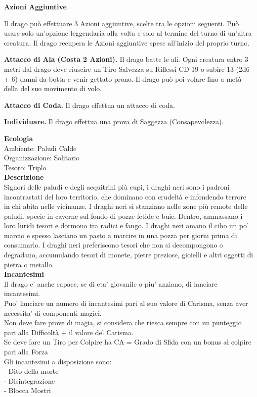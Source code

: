 \begin{multicols}{2}
\textbf{Azioni Aggiuntive}

Il drago può effettuare 3 Azioni aggiuntive, scelte tra le opzioni seguenti. Può usare solo un'opzione leggendaria alla volta e solo al termine del turno di un'altra creatura. Il drago recupera le Azioni aggiuntive spese all'inizio del proprio turno.

\textbf{Attacco di Ala (Costa 2 Azioni).} Il drago batte le ali. Ogni creatura entro 3 metri dal drago deve riuscire un Tiro Salvezza su Riflessi CD 19 o subire 13 (2d6 + 6) danni da botta e venir gettato prono. Il drago può poi volare fino a metà della del suo movimento di volo.

\textbf{Attacco di Coda.} Il drago effettua un attacco di coda.

\textbf{Individuare.} Il drago effettua una prova di Saggezza (Consapevolezza).

\textbf{Ecologia}\\
Ambiente: Paludi Calde\\
Organizzazione: Solitario\\
Tesoro: Triplo\\
\textbf{Descrizione}\\
Signori delle paludi e degli acquitrini più cupi, i draghi neri sono i padroni incontrastati del loro territorio, che dominano con crudeltà e infondendo terrore in chi abita nelle vicinanze. I draghi neri si stanziano nelle zone più remote delle paludi, specie in caverne sul fondo di pozze fetide e buie. Dentro, ammassano i loro luridi tesori e dormono tra radici e fango. I draghi neri amano il cibo un po' marcio e spesso lasciano un pasto a marcire in una pozza per giorni prima di consumarlo. I draghi neri preferiscono tesori che non si decompongono o degradano, accumulando tesori di monete, pietre preziose, gioielli e altri oggetti di pietra o metallo.\\
\textbf{Incantesimi}\\
Il drago e' anche capace, se di eta' giovanile o piu' anziano, di lanciare incantesimi.\\
Puo' lanciare un numero di incantesimi pari al suo valore di Carisma, senza aver necessita' di componenti magici.\\
Non deve fare prove di magia, si considera che riesca sempre con un punteggio pari alla Difficoltà + il valore del Carisma.\\
Se deve fare un Tiro per Colpire ha CA = Grado di Sfida con un bonus al colpire pari alla Forza\\
Gli incantesimi a disposizione sono:\\
- Dito della morte\\
- Disintegrazione\\
- Blocca Mostri\\



\end{multicols}
